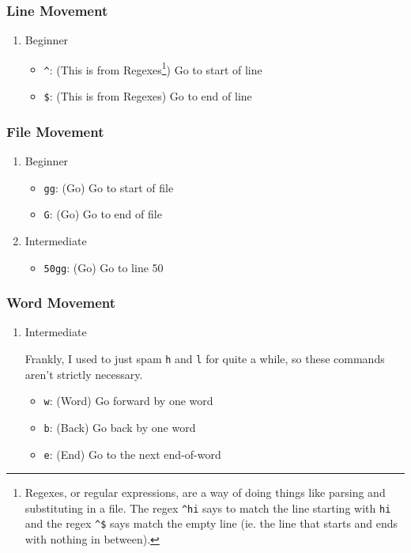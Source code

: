 \documentclass[11pt]{article}
\begin{document}
\subsubsection{Line Movement}
\label{sec:orgff93bce}
\begin{enumerate}
\item Beginner
\label{sec:org102af43}
\begin{itemize}
\item \texttt{\textasciicircum{}}: (This is from Regexes\footnote{Regexes, or regular expressions, are a way of doing things like 
parsing and substituting in a file. The regex \texttt{\textasciicircum{}hi} says to match the 
line starting with \texttt{hi} and the regex \texttt{\textasciicircum{}\$} says match the empty line 
(ie. the line that starts and ends with nothing in between).}) Go to start of line
\item \texttt{\$}: (This is from Regexes) Go to end of line
\end{itemize}
\end{enumerate}
\subsubsection{File Movement}
\label{sec:orgf952fc6}
\begin{enumerate}
\item Beginner
\label{sec:org6a150e9}
\begin{itemize}
\item \texttt{gg}: (Go) Go to start of file
\item \texttt{G}: (Go) Go to end of file
\end{itemize}
\item Intermediate
\label{sec:org904ffa1}
\begin{itemize}
\item \texttt{50gg}: (Go) Go to line 50
\end{itemize}
\end{enumerate}
\subsubsection{Word Movement}
\label{sec:orgddc61f1}
\begin{enumerate}
\item Intermediate
\label{sec:org4d0faaf}

Frankly, I used to just spam \texttt{h} and \texttt{l} for quite a while, so these commands
aren't strictly necessary.

\begin{itemize}
\item \texttt{w}: (Word) Go forward by one word
\item \texttt{b}: (Back) Go back by one word
\item \texttt{e}: (End) Go to the next end-of-word
\end{itemize}
\end{enumerate}
\end{document}
